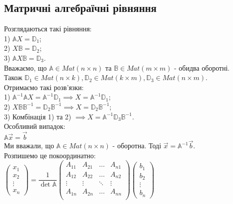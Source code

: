 \documentclass[a4paper, 10pt]{article}
\theoremstyle{theoremdd}
\begin{document}
\subsection{Матричні алгебраїчні рівняння}
Розглядаються такі рівняння:\\
1) $\mathbb{A} X = \mathbb{D}_1$;\\
2) $X \mathbb{B} = \mathbb{D}_2$;\\
3) $\mathbb{A} X \mathbb{B} = \mathbb{D}_3$.\\
Вважаємо, що $\mathbb{A} \in Mat(n \times n)$ та $\mathbb{B} \in Mat(m \times m)$ - обидва оборотні.\\
Також $\mathbb{D}_1 \in Mat(n \times k), \mathbb{D}_2 \in Mat(k \times m), \mathbb{D}_3 \in Mat(n \times m)$.\\
Отримаємо такі розв'язки:\\
1) $\mathbb{A}^{-1} \mathbb{A} X = \mathbb{A}^{-1} \mathbb{D}_1 \implies X = \mathbb{A}^{-1} \mathbb{D}_1$;\\
2) $X \mathbb{B} \mathbb{B}^{-1} = \mathbb{D}_2 \mathbb{B}^{-1} \implies X = \mathbb{D}_2 \mathbb{B}^{-1}$;\\
3) Комбінація 1) та 2) $\implies X = \mathbb{A}^{-1} \mathbb{D}_3 \mathbb{B}^{-1}$.
\bigskip \\
Особливий випадок:\\
$\mathbb{A} \vec{x} = \vec{b}$\\
Ми вважали, що $\mathbb{A} \in Mat(n \times n)$ - оборотна. Тоді $\vec{x} = \mathbb{A}^{-1} \vec{b}$.\\
Розпишемо це покоординатно:\\
$\begin{pmatrix}
x_1 \\ x_2 \\ \vdots \\ x_n
\end{pmatrix} = \dfrac{1}{\det \mathbb{A}} \begin{pmatrix}
A_{11} & A_{21} & \dots & A_{n1} \\
A_{12} & A_{22} & \dots & A_{n2} \\
\vdots & \vdots & \ddots & \vdots \\
A_{1n} & A_{2n} & \dots & A_{nn} \\
\end{pmatrix} \begin{pmatrix}
b_1 \\ b_2 \\ \vdots \\ b_n
\end{pmatrix}$\\
\end{document}
